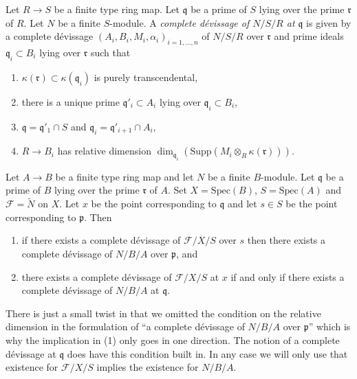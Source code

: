 \begin{definition}
\label{definition-complete-devissage-at-x-algebra}
Let $R \to S$ be a finite type ring map.
Let $\mathfrak q$ be a prime of $S$ lying over the prime $\mathfrak r$ of $R$.
Let $N$ be a finite $S$-module.
A {\it complete d\'evissage of $N/S/R$ at $\mathfrak q$} is given by a
complete d\'evissage $(A_i, B_i, M_i, \alpha_i)_{i = 1, \ldots, n}$
of $N/S/R$ over $\mathfrak r$ and prime ideals $\mathfrak q_i \subset B_i$
lying over $\mathfrak r$ such that
\begin{enumerate}
\item $\kappa(\mathfrak r) \subset \kappa(\mathfrak q_i)$ is purely
transcendental,
\item there is a unique prime $\mathfrak q'_i \subset A_i$
lying over $\mathfrak q_i \subset B_i$,
\item $\mathfrak q = \mathfrak q'_1 \cap S$ and
$\mathfrak q_i = \mathfrak q'_{i + 1} \cap A_i$,
\item $R \to B_i$ has relative dimension
$\dim_{\mathfrak q_i}(\text{Supp}(M_i \otimes_R \kappa(\mathfrak r)))$.
\end{enumerate}
\end{definition}

\begin{remark}
\label{remark-same-notion}
Let $A \to B$ be a finite type ring map and let $N$ be a finite
$B$-module. Let $\mathfrak q$ be a prime of $B$ lying over the prime
$\mathfrak r$ of $A$. Set $X = \text{Spec}(B)$, $S = \text{Spec}(A)$ and
$\mathcal{F} = \widetilde{N}$ on $X$. Let $x$ be the point corresponding
to $\mathfrak q$ and let $s \in S$ be the point corresponding to
$\mathfrak p$. Then
\begin{enumerate}
\item if there exists a complete d\'evissage of $\mathcal{F}/X/S$
over $s$ then there exists a complete d\'evissage of
$N/B/A$ over $\mathfrak p$, and
\item there exists a complete d\'evissage of $\mathcal{F}/X/S$
at $x$ if and only if there exists a complete d\'evissage of
$N/B/A$ at $\mathfrak q$.
\end{enumerate}
There is just a small twist in that we omitted the condition on
the relative dimension in the formulation of ``a complete d\'evissage of
$N/B/A$ over $\mathfrak p$'' which is why the implication in (1)
only goes in one direction.
The notion of a complete d\'evissage at
$\mathfrak q$ does have this condition built in. In any case we will
only use that existence for $\mathcal{F}/X/S$
implies the existence for $N/B/A$.
\end{remark}

